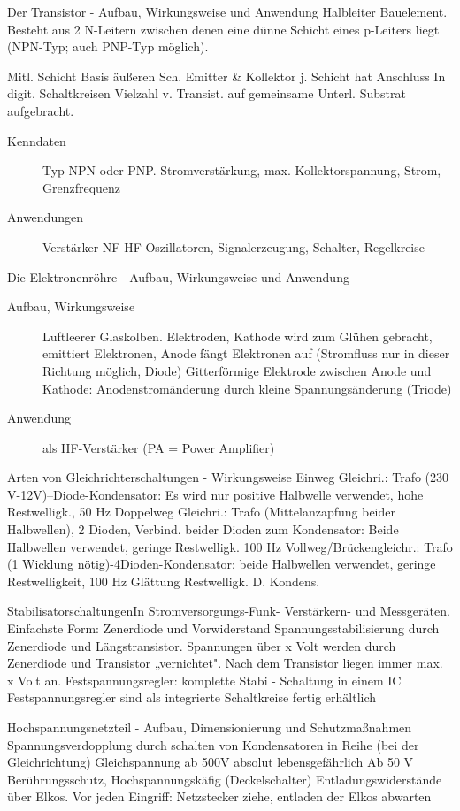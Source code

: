 \documentclass[avery5371,grid,frame,a4paper]{flashcards}
\newcommand{\card}[3]{
  \begin{flashcard}[{\chap} -- #1]{#2}#3\end{flashcard}
}
\begin{document}
\card{24}{Der Transistor - Aufbau, Wirkungsweise und Anwendung}{
  \small
  Halbleiter Bauelement. Besteht aus 2 N-Leitern zwischen denen eine dünne Schicht eines p-Leiters liegt (NPN-Typ; auch PNP-Typ möglich).

  Mitl. Schicht Basis äußeren Sch. Emitter \& Kollektor j. Schicht hat Anschluss
  In digit. Schaltkreisen Vielzahl v. Transist. auf gemeinsame
  Unterl. Substrat aufgebracht.

  \begin{description}
    \item[Kenndaten] Typ NPN oder PNP. Stromverstärkung, max. Kollektorspannung, Strom, Grenzfrequenz
    \item[Anwendungen] Verstärker NF-HF Oszillatoren, Signalerzeugung, Schalter, Regelkreise
  \end{description}
}
\card{25}{Die Elektronenröhre - Aufbau, Wirkungsweise und Anwendung}{
  \begin{description}
    \item[Aufbau, Wirkungsweise]
      Luftleerer Glaskolben. Elektroden, Kathode wird zum Glühen gebracht, emittiert Elektronen, Anode fängt Elektronen auf (Stromfluss nur in dieser Richtung möglich, Diode) Gitterförmige Elektrode zwischen Anode und Kathode: Anodenstromänderung durch kleine Spannungsänderung (Triode)
    \item[Anwendung] als HF-Verstärker (PA = Power Amplifier)
  \end{description}
}
\card{26}{Arten von Gleichrichterschaltungen - Wirkungsweise}{
  Einweg Gleichri.: Trafo (230 V-12V)–Diode-Kondensator: Es wird nur 
  positive Halbwelle verwendet, hohe Restwelligk., 50 Hz
  Doppelweg Gleichri.: Trafo (Mittelanzapfung beider Halbwellen), 2 Dioden,
  Verbind. beider Dioden zum Kondensator: Beide Halbwellen verwendet,
  geringe Restwelligk. 100 Hz
  Vollweg/Brückengleichr.: Trafo (1 Wicklung nötig)-4Dioden-Kondensator:
  beide Halbwellen verwendet, geringe Restwelligkeit, 100 Hz
  Glättung Restwelligk. D. Kondens.
}
\card{27}{Stabilisatorschaltungen}{In Stromversorgungs-Funk- Verstärkern- und Messgeräten.
Einfachste Form: Zenerdiode und Vorwiderstand Spannungsstabilisierung
durch Zenerdiode und Längstransistor.
Spannungen über x Volt werden durch Zenerdiode und Transistor „vernichtet".
Nach dem Transistor liegen immer max. x Volt an. 
Festspannungsregler: komplette Stabi - Schaltung in einem IC
Festspannungsregler sind als integrierte Schaltkreise fertig erhältlich
}
\card{28}{Hochspannungsnetzteil - Aufbau, Dimensionierung und Schutzmaßnahmen}{
  Spannungsverdopplung durch schalten von Kondensatoren in Reihe 
(bei der Gleichrichtung)
Gleichspannung ab 500V absolut lebensgefährlich
Ab  50 V Berührungsschutz, Hochspannungskäfig (Deckelschalter)
Entladungswiderstände über Elkos.
Vor jeden Eingriff: Netzstecker ziehe, entladen der Elkos abwarten
}
\end{document}
